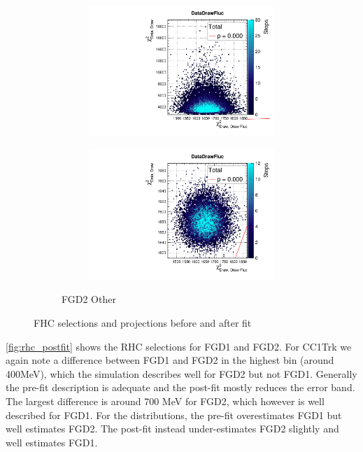 \begin{figure}[h]
\begin{subfigure}[t]{\textwidth}
\begin{subfigure}[t]{0.24\textwidth}
\includegraphics[width=\textwidth, trim={0mm 0mm 0mm 8mm}, clip,page=56]{figures/mach3/data/priorpred/2017b_NewDet_3Xsec_4Det_5Flux_NewXSecTune_Data_merge_PriorPred_procs}
\end{subfigure}
\begin{subfigure}[t]{0.24\textwidth}
	\includegraphics[width=\textwidth, trim={0mm 0mm 0mm 8mm}, clip,page=56]{figures/mach3/data/postpred/2017b_NewData_NewDet_UpdXsecStep_2Xsec_4Det_5Flux_0_PostPred_procs}
\end{subfigure}
\caption{FGD2 Other}
\end{subfigure}
\caption{FHC selections \pmu and \cosmu projections before and after fit}
\label{fig:fhc_postfit_other}
\end{figure}

\autoref{fig:rhc_postfit} shows the RHC \numubar selections for FGD1 and FGD2. For CC1Trk we again note a difference between FGD1 and FGD2 in the highest bin (around 400MeV), which the simulation describes well for FGD2 but not FGD1. Generally the pre-fit description is adequate and the post-fit mostly reduces the error band. The largest difference is around 700 MeV for FGD2, which however is well described for FGD1. For the \cosmu distributions, the pre-fit overestimates FGD1 but well estimates FGD2. The post-fit instead under-estimates FGD2 slightly and well estimates FGD1.

